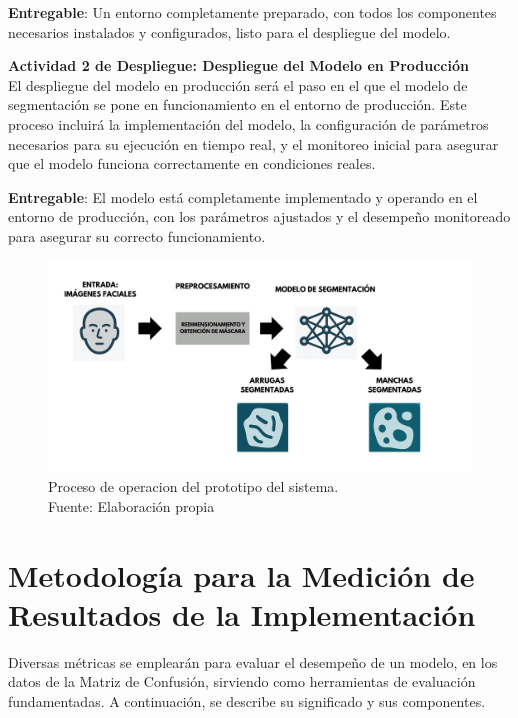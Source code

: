 \textbf{Entregable}: Un entorno completamente preparado, con todos los componentes necesarios instalados y configurados, listo para el despliegue del modelo.

\textbf{Actividad 2 de Despliegue: Despliegue del Modelo en Producción}
\\
El despliegue del modelo en producción será el paso en el que el modelo de segmentación se pone en funcionamiento en el entorno de producción. Este proceso incluirá la implementación del modelo, la configuración de parámetros necesarios para su ejecución en tiempo real, y el monitoreo inicial para asegurar que el modelo funciona correctamente en condiciones reales.

\textbf{Entregable}: El modelo está completamente implementado y operando en el entorno de producción, con los parámetros ajustados y el desempeño monitoreado para asegurar su correcto funcionamiento.

\begin{figure}[h]
    \begin{center}
        \includegraphics[width=1\textwidth]{3/figures/Prototipo de Despliegue.png}
        \caption[Proceso de operacion del prototipo del sistema]{Proceso de operacion del prototipo del sistema.\\
        Fuente: Elaboración propia}
        \label{3:fig6}
    \end{center}
\end{figure}

\section{Metodología para la Medición de Resultados de la Implementación}

Diversas métricas se emplearán para evaluar el desempeño de un modelo, en los datos de la Matriz de Confusión, sirviendo como herramientas de evaluación fundamentadas. A continuación, se describe su significado y sus componentes.

